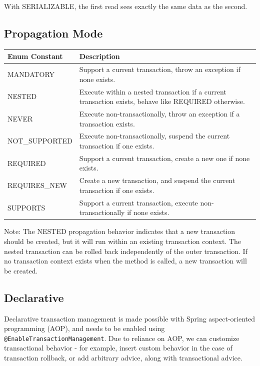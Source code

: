\documentclass{scrartcl}
\begin{document}
With SERIALIZABLE, the first read sees exactly the same data as the second.

\subsection{Propagation Mode}

\begin{table}[h!]

\begin{tabular}{p{.35\linewidth}  p{.6\linewidth}}
    \hline
    Enum Constant& Description \\
    \hline
    MANDATORY&  Support a current transaction, throw an exception if none exists.\\
    \hline
    NESTED&  Execute within a nested transaction if a current transaction exists, behave like REQUIRED otherwise.\\
    \hline
    NEVER &  Execute non-transactionally, throw an exception if a transaction exists.\\
    \hline
    NOT\_SUPPORTED& Execute non-transactionally, suspend the current transaction if one exists.\\
    \hline
    REQUIRED &  Support a current transaction, create a new one if none exists.\\
    \hline
    REQUIRES\_NEW &  Create a new transaction, and suspend the current transaction if one exists.\\
    \hline
    SUPPORTS&  Support a current transaction, execute non-transactionally if none exists.\\
    \hline
\end{tabular}
\end{table}

Note: The NESTED propagation behavior indicates that a new transaction should be created, but it will run within an existing transaction context. The nested transaction can be rolled back independently of the outer transaction. If no transaction context exists when the method is called, a new transaction will be created.

\subsection{Declarative}

Declarative transaction management is made possible with Spring aspect-oriented programming (AOP), and needs to be enabled using \lstinline|@EnableTransactionManagement|. Due to reliance on AOP, we can customize transactional behavior - for example, insert custom behavior in the case of transaction rollback, or add arbitrary advice, along with transactional advice.
\end{document}
